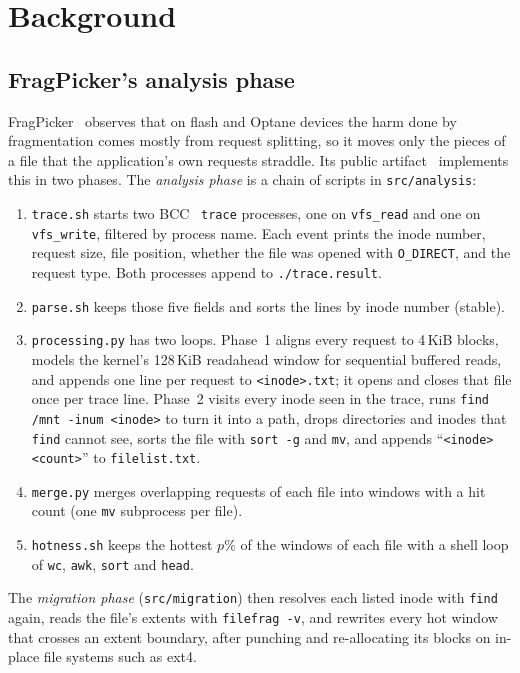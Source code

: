 \section{Background}
\label{sec:background}

\subsection{FragPicker's analysis phase}
FragPicker~\cite{park2021fragpicker} observes that on flash and Optane devices the
harm done by fragmentation comes mostly from request splitting, so it moves only
the pieces of a file that the application's own requests straddle. Its public
artifact~\cite{fragpickerartifact} implements this in two phases. The
\emph{analysis phase} is a chain of scripts in \texttt{src/analysis}:
\begin{enumerate}
\item \texttt{trace.sh} starts two BCC~\cite{bcc} \texttt{trace} processes, one
  on \texttt{vfs\_read} and one on \texttt{vfs\_write}, filtered by process name.
  Each event prints the inode number, request size, file position, whether the file
  was opened with \texttt{O\_DIRECT}, and the request type. Both processes append to
  \texttt{./trace.result}.
\item \texttt{parse.sh} keeps those five fields and sorts the lines by inode
  number (stable).
\item \texttt{processing.py} has two loops. Phase~1 aligns every request to 4\,KiB
  blocks, models the kernel's 128\,KiB readahead window for sequential buffered
  reads, and appends one line per request to \texttt{<inode>.txt}; it opens and
  closes that file once per trace line. Phase~2 visits every inode seen in the
  trace, runs \texttt{find /mnt -inum <inode>} to turn it into a path, drops
  directories and inodes that \texttt{find} cannot see, sorts the file with
  \texttt{sort -g} and \texttt{mv}, and appends ``\texttt{<inode> <count>}'' to
  \texttt{filelist.txt}.
\item \texttt{merge.py} merges overlapping requests of each file into windows with
  a hit count (one \texttt{mv} subprocess per file).
\item \texttt{hotness.sh} keeps the hottest $p\%$ of the windows of each file with a
  shell loop of \texttt{wc}, \texttt{awk}, \texttt{sort} and \texttt{head}.
\end{enumerate}
The \emph{migration phase} (\texttt{src/migration}) then resolves each listed inode
with \texttt{find} again, reads the file's extents with \texttt{filefrag -v}, and
rewrites every hot window that crosses an extent boundary, after punching and
re-allocating its blocks on in-place file systems such as ext4.

